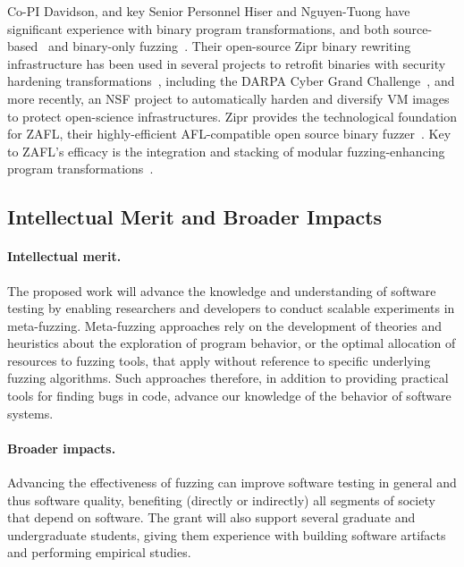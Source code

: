 Co-PI Davidson, and key Senior Personnel Hiser and Nguyen-Tuong have significant
experience with binary program transformations, and both source-based~\cite{ahmed2021bigmap} and binary-only fuzzing~\cite{nagy2021breaking,nagy2021same}.
Their open-source Zipr binary rewriting infrastructure has been used in several
projects to retrofit binaries with security hardening transformations~\cite{zipr,hawkins2017zipr,hawkins2017securing,hiser2017zipr++,schulte2022broad}, including
the DARPA Cyber Grand Challenge~\cite{nguyen2018xandra}, and more recently, an NSF project to automatically harden and diversify VM images~\cite{davidson2023helix++}
to protect open-science infrastructures. 
Zipr provides the technological foundation for ZAFL, their highly-efficient AFL-compatible open source binary fuzzer~\cite{zafl}.
Key to ZAFL's efficacy is the integration and stacking of modular fuzzing-enhancing program transformations~\cite{nagy2021breaking,nagy2021same}.

\subsection{Intellectual Merit and Broader Impacts}

\paragraph{Intellectual merit.} The proposed work will advance the
knowledge and understanding of software testing by enabling
researchers and developers to conduct scalable experiments in meta-fuzzing.  
Meta-fuzzing approaches rely on the development of theories and heuristics 
about the exploration of program behavior, or the optimal allocation of 
resources to fuzzing tools, that apply without reference to specific underlying 
fuzzing algorithms.  Such approaches therefore, in addition to providing 
practical tools for finding bugs in code, advance our knowledge of the behavior 
of software systems.

\paragraph{Broader impacts.} Advancing the effectiveness of fuzzing can improve 
software testing in general and
thus software quality, benefiting (directly or indirectly) all
segments of society that depend on software.  The grant
will also support several graduate and undergraduate students, giving them 
experience with
building software artifacts and performing empirical studies.


